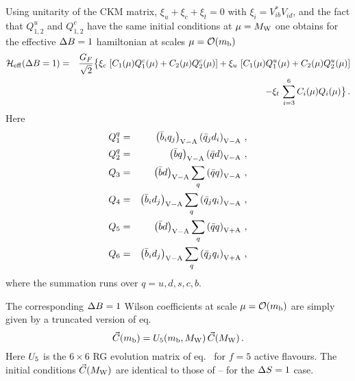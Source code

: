 Using unitarity of the CKM matrix, $\xi_u + \xi_c + \xi_t = 0$ with
$\xi_i = V^*_{ib} V^{}_{id}$, and the fact that $Q^u_{1,2}$ and
$Q^c_{1,2}$ have the same initial conditions at
$\mu=M_{\rm W}$ one obtains for the effective $\Delta B=1$ hamiltonian at scales
$\mu = {\cal O}(m_{\rm b})$
\begin{eqnarray} 
{\cal H}_{\rm eff}(\Delta B=1) &=& \frac{G_F}{\sqrt{2}} \bigl\{
   \xi_c \, \left[ C_1(\mu) Q_1^c(\mu) + C_2(\mu) Q_2^c(\mu) \right] +
   \xi_u \, \left[ C_1(\mu) Q_1^u(\mu) + C_2(\mu) Q_2^u(\mu) \right] 
\nonumber \\
 & & - \xi_t \, \sum_{i=3}^{6} C_i(\mu) Q_i(\mu)
\bigr\} \, .
\label{eq:HeffdB1:66}
\end{eqnarray} 
Here
\begin{eqnarray}
Q^q_{1} & = & \left( \bar b_{i} q_{j}  \right)_{\rm V-A}
            \left( \bar q_{j}  d_{i} \right)_{\rm V-A}
\, , \nonumber \\
Q^q_{2} & = & \left( \bar b q \right)_{\rm V-A}
            \left( \bar q d \right)_{\rm V-A}
\, , \nonumber \\
Q_{3} & = & \left( \bar b d \right)_{\rm V-A}
   \sum_{q} \left( \bar q q \right)_{\rm V-A}
\, , \label{eq:dB1basis} \\
Q_{4} & = & \left( \bar b_{i} d_{j}  \right)_{\rm V-A}
   \sum_{q} \left( \bar q_{j}  q_{i} \right)_{\rm V-A}
\, , \nonumber \\
Q_{5} & = & \left( \bar b d \right)_{\rm V-A}
   \sum_{q} \left( \bar q q \right)_{\rm V+A}
\, , \nonumber \\
Q_{6} & = & \left( \bar b_{i} d_{j}  \right)_{\rm V-A}
   \sum_{q} \left( \bar q_{j}  q_{i} \right)_{\rm V+A}
\, , \nonumber
\end{eqnarray}
where the summation runs over $q=u,d,s,c,b$. 

The corresponding $\Delta B=1$ Wilson coefficients at scale $\mu = {\cal O}(m_{\rm b})$
are simply given by a truncated version of eq.\ 
\begin{equation}
\vec{C}(m_{\rm b}) = U_5(m_{\rm b},M_{\rm W}) \, \vec{C}(M_{\rm W}) \, .
\label{eq:HeffdB1:66:wc}
\end{equation}
Here $U_5$ is the $6 \times 6$ RG evolution matrix of eq.\
 for $f=5$ active flavours. The initial conditions
$\vec{C}(M_{\rm W})$ are identical to those of \eqn{eq:CMw1QCD}--
for the $\Delta S=1$ case.

